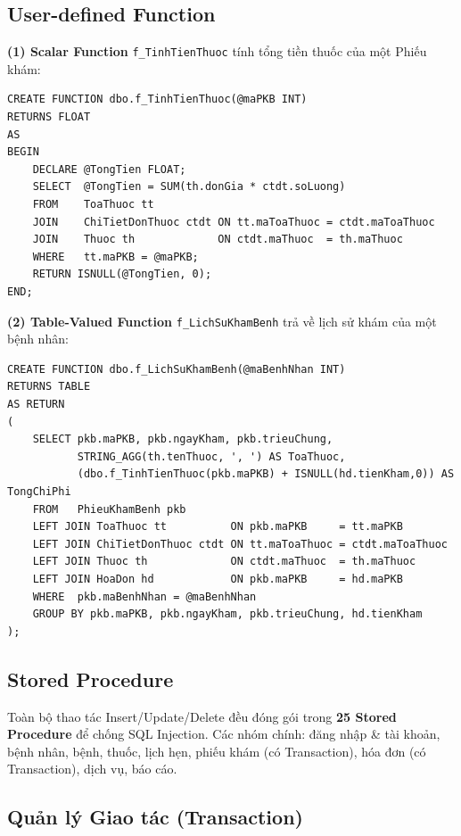 \documentclass[12pt,a4paper]{report}
\begin{document}
\subsection{User-defined Function}

\textbf{(1) Scalar Function} \texttt{f\_TinhTienThuoc} tính tổng tiền thuốc của một Phiếu khám:

\begin{lstlisting}[language=TSQL,caption={Scalar Function tính tiền thuốc}]
CREATE FUNCTION dbo.f_TinhTienThuoc(@maPKB INT)
RETURNS FLOAT
AS
BEGIN
    DECLARE @TongTien FLOAT;
    SELECT  @TongTien = SUM(th.donGia * ctdt.soLuong)
    FROM    ToaThuoc tt
    JOIN    ChiTietDonThuoc ctdt ON tt.maToaThuoc = ctdt.maToaThuoc
    JOIN    Thuoc th             ON ctdt.maThuoc  = th.maThuoc
    WHERE   tt.maPKB = @maPKB;
    RETURN ISNULL(@TongTien, 0);
END;
\end{lstlisting}

\textbf{(2) Table-Valued Function} \texttt{f\_LichSuKhamBenh} trả về lịch sử khám của một bệnh nhân:

\begin{lstlisting}[language=TSQL,caption={Table-Valued Function tra cứu lịch sử khám}]
CREATE FUNCTION dbo.f_LichSuKhamBenh(@maBenhNhan INT)
RETURNS TABLE
AS RETURN
(
    SELECT pkb.maPKB, pkb.ngayKham, pkb.trieuChung,
           STRING_AGG(th.tenThuoc, ', ') AS ToaThuoc,
           (dbo.f_TinhTienThuoc(pkb.maPKB) + ISNULL(hd.tienKham,0)) AS TongChiPhi
    FROM   PhieuKhamBenh pkb
    LEFT JOIN ToaThuoc tt          ON pkb.maPKB     = tt.maPKB
    LEFT JOIN ChiTietDonThuoc ctdt ON tt.maToaThuoc = ctdt.maToaThuoc
    LEFT JOIN Thuoc th             ON ctdt.maThuoc  = th.maThuoc
    LEFT JOIN HoaDon hd            ON pkb.maPKB     = hd.maPKB
    WHERE  pkb.maBenhNhan = @maBenhNhan
    GROUP BY pkb.maPKB, pkb.ngayKham, pkb.trieuChung, hd.tienKham
);
\end{lstlisting}

\subsection{Stored Procedure}

Toàn bộ thao tác Insert/Update/Delete đều đóng gói trong \textbf{25 Stored Procedure} để chống SQL Injection. Các nhóm chính: đăng nhập \& tài khoản, bệnh nhân, bệnh, thuốc, lịch hẹn, phiếu khám (có Transaction), hóa đơn (có Transaction), dịch vụ, báo cáo.

\subsection{Quản lý Giao tác (Transaction)}
\end{document}
